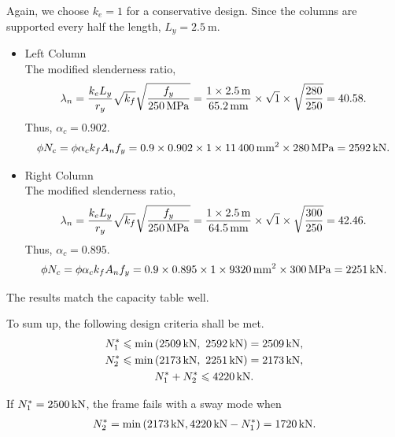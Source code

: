 \begin{solution}
\begin{itemize}
Again, we choose $k_e=1$ for a conservative design. Since the columns are supported every half the length, $L_y=\SI{2.5}{\meter}$.
\begin{itemize}
\item Left Column\\
The modified slenderness ratio,
\begin{gather*}
\lambda_n=\dfrac{k_eL_y}{r_y}\sqrt{k_f}\sqrt{\dfrac{f_y}{\SI{250}{\mega\pascal}}}=\dfrac{1\times\SI{2.5}{\meter}}{\SI{65.2}{\milli\meter}}\times\sqrt{1}\times\sqrt{\dfrac{280}{250}}=40.58.
\end{gather*}
Thus, $\alpha_c=0.902$.
\begin{gather*}
\phi{}N_c=\phi\alpha_ck_fA_nf_y=0.9\times0.902\times1\times\SI{11400}{\milli\meter^2}\times\SI{280}{\mega\pascal}=\SI{2592}{\kilo\newton}.
\end{gather*}
\item Right Column\\
The modified slenderness ratio,
\begin{gather*}
\lambda_n=\dfrac{k_eL_y}{r_y}\sqrt{k_f}\sqrt{\dfrac{f_y}{\SI{250}{\mega\pascal}}}=\dfrac{1\times\SI{2.5}{\meter}}{\SI{64.5}{\milli\meter}}\times\sqrt{1}\times\sqrt{\dfrac{300}{250}}=42.46.
\end{gather*}
Thus, $\alpha_c=0.895$.
\begin{gather*}
\phi{}N_c=\phi\alpha_ck_fA_nf_y=0.9\times0.895\times1\times\SI{9320}{\milli\meter^2}\times\SI{300}{\mega\pascal}=\SI{2251}{\kilo\newton}.
\end{gather*}
\end{itemize}
The results match the capacity table well.
\end{itemize}
To sum up, the following design criteria shall be met.
\begin{gather*}
N^*_1\leqslant\min\left(\SI{2509}{\kilo\newton},~\SI{2592}{\kilo\newton}\right)=\SI{2509}{\kilo\newton},\\
N^*_2\leqslant\min\left(\SI{2173}{\kilo\newton},~\SI{2251}{\kilo\newton}\right)=\SI{2173}{\kilo\newton},\\
N^*_1+N^*_2\leqslant\SI{4220}{\kilo\newton}.
\end{gather*}

If $N^*_1=\SI{2500}{\kilo\newton}$, the frame fails with a sway mode when
\begin{gather*}
N^*_2=\min\left(\SI{2173}{\kilo\newton},\SI{4220}{\kilo\newton}-N^*_1\right)=\SI{1720}{\kilo\newton}.
\end{gather*}
\end{solution}

